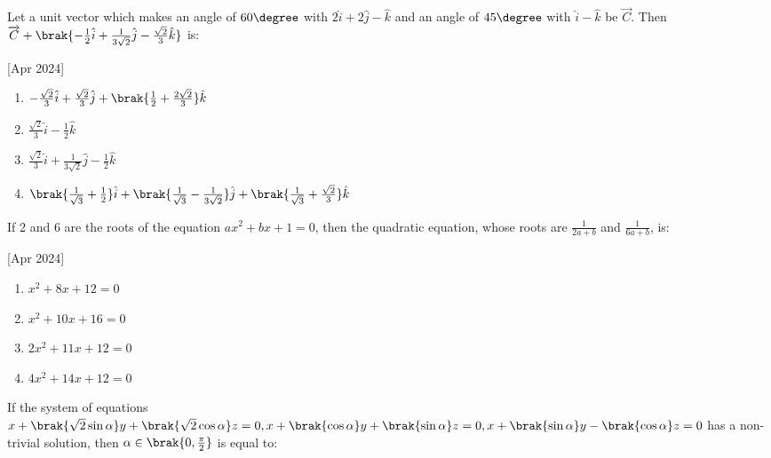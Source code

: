    \item Let a unit vector which makes an angle of $60\degree$ with $2\hat{i}+2\hat{j}-\hat{k}$ and an angle of $45\degree$ with $\hat{i}-\hat{k}$ be $\overrightarrow{C}$. Then $\overrightarrow{C}+\brak{-\frac{1}{2}\hat{i}+\frac{1}{3\sqrt{2}}\hat{j}-\frac{\sqrt{2}}{3}\hat{k}}$ is:
    
    \hfill[Apr 2024]

        \begin{multicols}{2}
            \begin{enumerate}
                \item $-\frac{\sqrt{2}}{3}\hat{i}+\frac{\sqrt{2}}{3}\hat{j}+\brak{\frac{1}{2}+\frac{2\sqrt{2}}{3}}\hat{k}$
                \item $\frac{\sqrt{2}}{3}\hat{i}-\frac{1}{2}\hat{k}$
                \item $\frac{\sqrt{2}}{3}\hat{i}+\frac{1}{3\sqrt{2}}\hat{j}-\frac{1}{2}\hat{k}$
                \item $\brak{\frac{1}{\sqrt{3}}+\frac{1}{2}}\hat{i}+\brak{\frac{1}{\sqrt{3}}-\frac{1}{3\sqrt{2}}}\hat{j}+\brak{\frac{1}{\sqrt{3}}+\frac{\sqrt{2}}{3}}\hat{k}$ 
            \end{enumerate}
        \end{multicols}
        
    \item If 2 and 6 are the roots of the equation $ax^2+bx+1=0$, then the quadratic equation, whose roots are $\frac{1}{2a+b}$ and $\frac{1}{6a+b}$, is:
    
    \hfill[Apr 2024]

        \begin{multicols}{4}
            \begin{enumerate}
                \item $x^2+8x+12=0$
                \item $x^2+10x+16=0$
                \item $2x^2+11x+12=0$
                \item $4x^2+14x+12=0$
            \end{enumerate}
        \end{multicols}

    \item If the system of equations $x+\brak{\sqrt{2}\sin\alpha}y+\brak{\sqrt{2}\cos\alpha}z=0, x+\brak{\cos\alpha}y+\brak{\sin\alpha}z=0, x+\brak{\sin\alpha}y-\brak{\cos\alpha}z=0$ has a non-trivial solution, then $\alpha\in\brak{0,\frac{\pi}{2}}$ is equal to:
    
